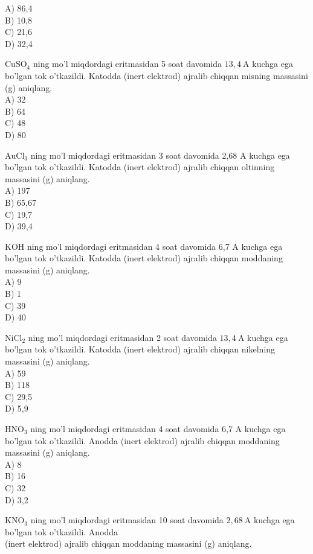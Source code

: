 A) 86,4\\
B) 10,8\\
C) 21,6\\
D) 32,4 
  \item $\mathrm{CuSO}_{4}$ ning mo'l miqdordagi eritmasidan 5 soat davomida $13,4 \mathrm{~A}$ kuchga ega bo'lgan tok o'tkazildi. Katodda (inert elektrod) ajralib chiqqan misning massasini (g) aniqlang.\\
A) 32\\
B) 64\\
C) 48\\
D) 80
  \item $\mathrm{AuCl}_{3}$ ning mo'l miqdordagi eritmasidan 3 soat davomida 2,68 A kuchga ega bo'lgan tok o'tkazildi. Katodda (inert elektrod) ajralib chiqqan oltinning massasini (g) aniqlang.\\
A) 197\\
B) 65,67\\
C) 19,7\\
D) 39,4
  \item KOH ning mo'l miqdordagi eritmasidan 4 soat davomida 6,7 A kuchga ega bo'lgan tok o'tkazildi. Katodda (inert elektrod) ajralib chiqqan moddaning massasini (g) aniqlang.\\
A) 9\\
B) 1\\
C) 39\\
D) 40
  \item $\mathrm{NiCl}_{2}$ ning mo'l miqdordagi eritmasidan 2 soat davomida $13,4 \mathrm{~A}$ kuchga ega bo'lgan tok o'tkazildi. Katodda (inert elektrod) ajralib chiqqan nikelning massasini (g) aniqlang.\\
A) 59\\
B) 118\\
C) 29,5\\
D) 5,9
  \item $\mathrm{HNO}_{3}$ ning mo'l miqdordagi eritmasidan 4 soat davomida 6,7 A kuchga ega bo'lgan tok o'tkazildi. Anodda (inert elektrod) ajralib chiqqan moddaning massasini (g) aniqlang.\\
A) 8\\
B) 16\\
C) 32\\
D) 3,2
  \item $\mathrm{KNO}_{3}$ ning mo'l miqdordagi eritmasidan 10 soat davomida $2,68 \mathrm{~A}$ kuchga ega bo'lgan tok o'tkazildi. Anodda\\
(inert elektrod) ajralib chiqqan moddaning massasini (g) aniqlang.\\
